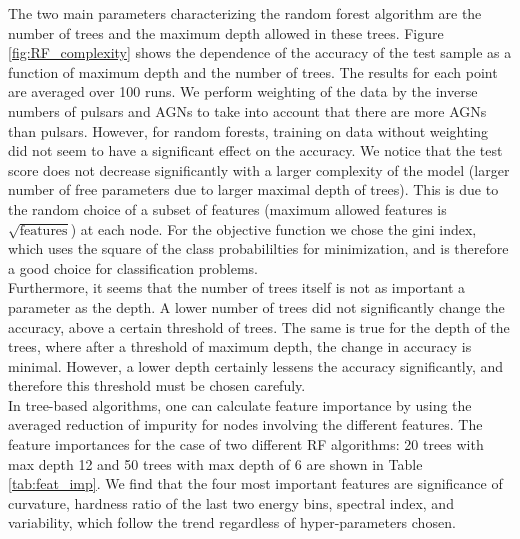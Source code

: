 The two main parameters characterizing the random forest algorithm are the number of trees and the maximum depth allowed in these trees. 
Figure \ref{fig:RF_complexity} shows the dependence of the accuracy of the test sample as a function of maximum depth and the number of trees. 
The results for each point are averaged over 100 runs.
We perform weighting of the data by the inverse numbers of pulsars and AGNs to take into account that there are more AGNs than pulsars. However, for random forests, training on data without weighting did not seem to have a significant effect on the accuracy.
We notice that the test score does not decrease significantly with a larger complexity of the model 
(larger number of free parameters due to larger maximal depth of trees).
This is due to the random choice of a subset of features (maximum allowed features is $\sqrt{\text{features}}$) at each node.
For the objective function we chose the gini index, which uses the square of the class probabililties for minimization, and is therefore a good choice for classification problems.\\
 Furthermore, it seems that the number of trees itself is not as important a parameter as the depth. A lower number of trees did not significantly change the accuracy, above a certain threshold of trees. The same is true for the depth of the trees, where after a threshold of maximum depth, the change in accuracy is minimal. However, a lower depth certainly lessens the accuracy significantly, and therefore this threshold must be chosen carefuly.\\

In tree-based algorithms, one can calculate feature importance by using the averaged reduction of impurity for nodes involving the different features. The feature importances for the case of two different RF algorithms: 20 trees with max depth 12 and 50 trees with max depth of 6 are shown in Table \ref{tab:feat_imp}.
We find that the four most important features are significance of curvature, hardness ratio of the last two energy bins, spectral index, and variability, which follow the trend regardless of hyper-parameters chosen.


